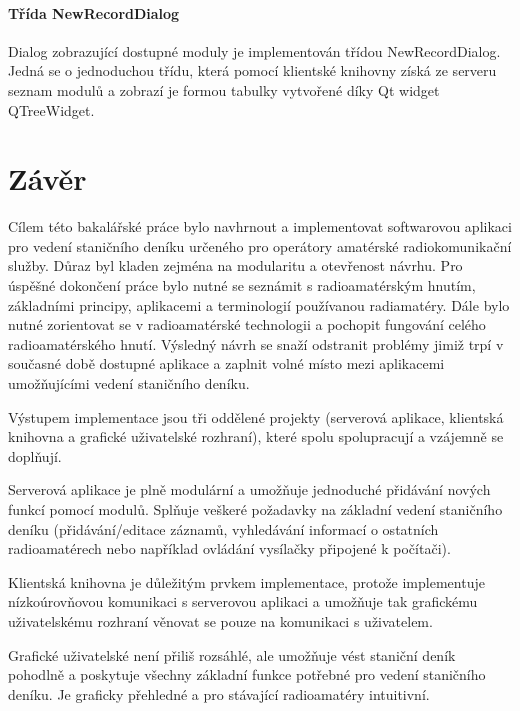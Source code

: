 \subsubsection{Třída NewRecordDialog}

Dialog zobrazující dostupné moduly je implementován třídou NewRecordDialog. Jedná se o jednoduchou třídu, která pomocí
klientské knihovny získá ze serveru seznam modulů a zobrazí je formou tabulky vytvořené díky Qt widget QTreeWidget.


\chapter{Závěr}
Cílem této bakalářské práce bylo navhrnout a implementovat softwarovou aplikaci
pro vedení staničního deníku určeného pro operátory amatérské radiokomunikační služby. Důraz byl kladen zejména
na modularitu a otevřenost návrhu. Pro úspěšné dokončení práce bylo nutné se seznámit s radioamatérským
hnutím, základními principy, aplikacemi a terminologií používanou radiamatéry.
Dále bylo nutné zorientovat se v 
radioamatérské technologii a pochopit fungování celého radioamatérského hnutí.
Výsledný návrh se snaží odstranit problémy jimiž trpí v současné době dostupné
aplikace a zaplnit volné místo mezi aplikacemi
umožňujícími vedení staničního deníku.

Výstupem implementace jsou tři oddělené projekty (serverová aplikace, klientská knihovna a grafické uživatelské rozhraní),
které spolu spolupracují a vzájemně se doplňují.

Serverová aplikace je plně modulární a umožňuje jednoduché přidávání nových
funkcí pomocí modulů. Splňuje veškeré požadavky na základní vedení staničního deníku (přidávání/editace záznamů, vyhledávání 
informací o ostatních radioamatérech nebo například ovládání vysílačky připojené k počítači).

Klientská knihovna je důležitým prvkem implementace, protože implementuje nízkoúrovňovou komunikaci s serverovou aplikaci
a umožňuje tak grafickému uživatelskému rozhraní věnovat se pouze na komunikaci s uživatelem.

Grafické uživatelské není přiliš rozsáhlé, ale umožňuje vést staniční deník pohodlně a poskytuje všechny základní funkce potřebné
pro vedení staničního deníku. Je graficky přehledné a pro stávající radioamatéry intuitivní.

